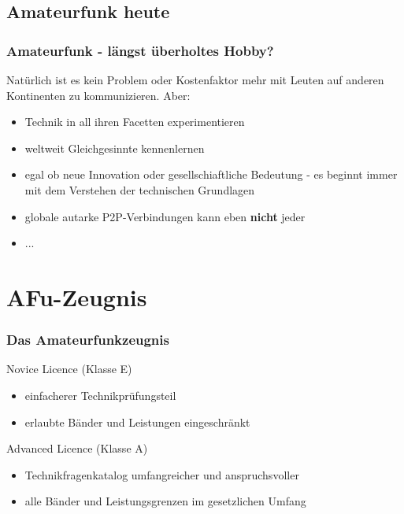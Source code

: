 \subsection{Amateurfunk heute}

\begin{frame}
    \frametitle{Amateurfunk - längst überholtes Hobby?}

    Natürlich ist es kein Problem oder Kostenfaktor mehr mit Leuten auf
    anderen Kontinenten zu kommunizieren. Aber:

    \begin{itemize}
        \item Technik in all ihren Facetten experimentieren
        \item weltweit Gleichgesinnte kennenlernen
        \item egal ob neue Innovation oder gesellschiaftliche Bedeutung - es beginnt
              immer mit dem Verstehen der technischen Grundlagen
        \item globale autarke P2P-Verbindungen kann eben \textbf{nicht} jeder
        \item ...
    \end{itemize}

\end{frame}

\section{AFu-Zeugnis}

\begin{frame}
    \frametitle{Das Amateurfunkzeugnis}

    Novice Licence (Klasse E)
    
    \begin{itemize}
        \item einfacherer Technikprüfungsteil
        \item erlaubte Bänder und Leistungen eingeschränkt
    \end{itemize}

    Advanced Licence (Klasse A)
    
    \begin{itemize}
        \item Technikfragenkatalog umfangreicher und anspruchsvoller
        \item alle Bänder und Leistungsgrenzen im gesetzlichen Umfang
    \end{itemize}

\end{frame}

